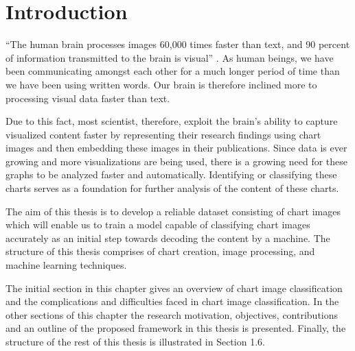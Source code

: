 \documentclass[12pt, a4paper,oneside]{report}
\begin{document}

\setcounter{tocdepth}{10}

\clearpage
\tableofcontents





\listoffigures
\listoftables

\titleformat{\chapter}{\LARGE\bfseries}{\thechapter}{1em}{}

\newpage


\newpage
\chapter{Introduction}
``The human brain processes images 60,000 times faster than text, and 90 percent of information transmitted to the brain is visual'' \cite{humaneye}. As human beings, we have been communicating amongst each other for a much longer period of time than we have been using written words. Our brain is therefore inclined more to processing visual data faster than text.

Due to this fact, most scientist, therefore, exploit the brain's ability to capture visualized content faster by representing their research findings using chart images and then embedding these images in their publications. Since data is ever growing and more visualizations are being used, there is a growing need for these graphs to be analyzed faster and automatically. Identifying or classifying these charts serves as a foundation for further analysis of the content of these charts.  

The aim of this thesis is to develop a reliable dataset consisting of chart images which will enable us to train a model capable of classifying chart images accurately as an initial step towards decoding the content by a machine. The structure of this thesis comprises of chart creation, image processing, and machine learning techniques.

The initial section in this chapter gives an overview of chart image classification and the complications and difficulties faced in chart image classification. In the other sections of this chapter the research motivation, objectives, contributions and an outline of the proposed framework in this thesis is presented. Finally, the structure of the rest of this thesis is illustrated in Section 1.6.
\end{document}
